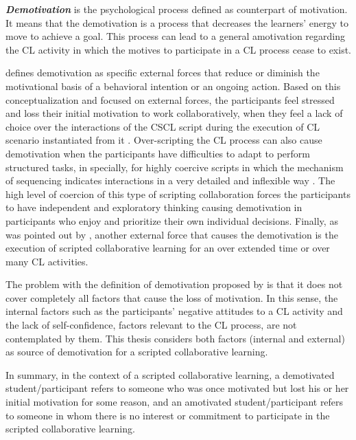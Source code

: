 \textbf{\emph{Demotivation}} is the psychological process defined as counterpart of motivation.
It means that the demotivation is a process that decreases the learners' energy to move to achieve a goal.
This process can lead to a general amotivation regarding the CL activity in which the motives to participate in a CL process cease to exist.

 defines demotivation as specific external forces that reduce or diminish the motivational basis of a behavioral intention or an ongoing action.
Based on this conceptualization and focused on external forces, the participants feel stressed and loss their initial motivation to work collaboratively, when they feel a lack of choice over the interactions of the CSCL script during the execution of CL scenario instantiated from it \cite{Isotani2009}.
Over-scripting the CL process can also cause demotivation when the participants have difficulties to adapt to perform structured tasks, in specially, for highly coercive scripts in which the mechanism of sequencing indicates interactions in a very detailed and inflexible way \cite{Dillenbourg2002}. The high level of coercion of this type of scripting collaboration forces the participants to have independent and exploratory thinking causing demotivation in participants who enjoy and prioritize their own individual decisions.
Finally, as was pointed out by , another external force that causes the demotivation is the execution of scripted collaborative learning for an over extended time or over many CL activities.

The problem with the definition of demotivation proposed by  is that it does not cover completely all factors that cause the loss of motivation.
In this sense, the internal factors such as the participants' negative attitudes to a CL activity and the lack of self-confidence, factors relevant to the CL process, are not contemplated by them.
This thesis considers both factors (internal and external) as source of demotivation for a scripted collaborative learning.

In summary, in the context of a scripted collaborative learning, a demotivated student/participant refers to someone who was once motivated but lost his or her initial motivation for some reason, and an amotivated student/participant refers to someone in whom there is no interest or commitment to participate in the scripted collaborative learning.



